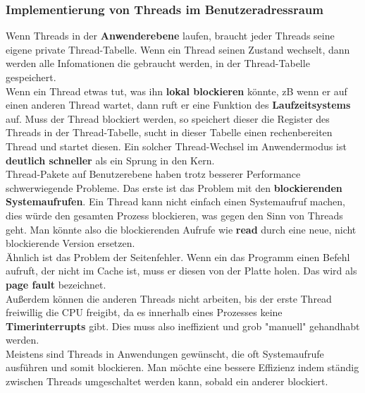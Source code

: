 \documentclass[12pt,a4paper]{univention}
\begin{document}
\subsubsection{Implementierung von Threads im Benutzeradressraum}
Wenn Threads in der \textbf{Anwenderebene} laufen, braucht jeder Threads seine eigene private Thread-Tabelle. Wenn ein Thread seinen Zustand wechselt, dann werden alle Infomationen die gebraucht werden, in der Thread-Tabelle gespeichert.\\
Wenn ein Thread etwas tut, was ihn \textbf{lokal blockieren} könnte, zB wenn er auf einen anderen Thread wartet, dann ruft er eine Funktion des \textbf{Laufzeitsystems} auf. Muss der Thread blockiert werden, so speichert dieser die Register des Threads in der Thread-Tabelle, sucht in dieser Tabelle einen rechenbereiten Thread und startet diesen. Ein solcher Thread-Wechsel im Anwendermodus ist \textbf{deutlich schneller} als ein Sprung in den Kern.\\
Thread-Pakete auf Benutzerebene haben trotz besserer Performance schwerwiegende Probleme. Das erste ist das Problem mit den \textbf{blockierenden Systemaufrufen}. Ein Thread kann nicht einfach einen Systemaufruf machen, dies würde den gesamten Prozess blockieren, was gegen den Sinn von Threads geht. Man könnte also die blockierenden Aufrufe wie \textbf{read} durch eine neue, nicht blockierende Version ersetzen. \\
Ähnlich ist das Problem der Seitenfehler. Wenn ein das Programm einen Befehl aufruft, der nicht im Cache ist, muss er diesen von der Platte holen. Das wird als \textbf{page fault} bezeichnet.\\
Außerdem können die anderen Threads nicht arbeiten, bis der erste Thread freiwillig die CPU freigibt, da es innerhalb eines Prozesses keine \textbf{Timerinterrupts} gibt. Dies muss also ineffizient und grob "manuell" gehandhabt werden.\\
Meistens sind Threads in Anwendungen gewünscht, die oft Systemaufrufe ausführen und somit blockieren. Man möchte eine bessere Effizienz indem ständig zwischen Threads umgeschaltet werden kann, sobald ein anderer blockiert.\\
\end{document}
